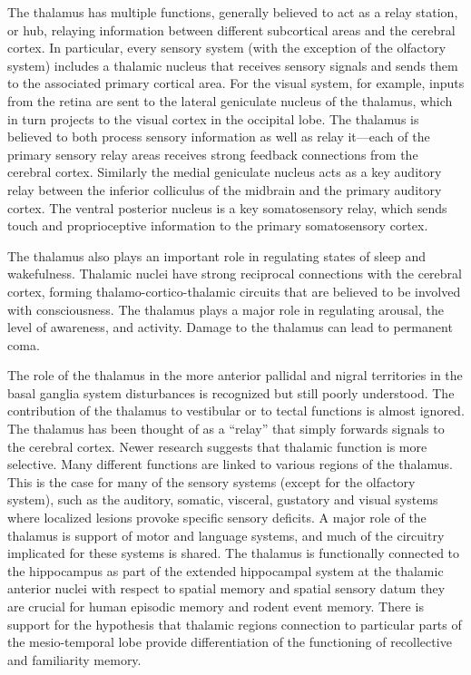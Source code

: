 The thalamus has multiple functions, generally believed to act as a relay station, or hub, relaying information between different subcortical areas and the cerebral cortex. In particular, every sensory system (with the exception of the olfactory system) includes a thalamic nucleus that receives sensory signals and sends them to the associated primary cortical area. For the visual system, for example, inputs from the retina are sent to the lateral geniculate nucleus of the thalamus, which in turn projects to the visual cortex in the occipital lobe. The thalamus is believed to both process sensory information as well as relay it---each of the primary sensory relay areas receives strong feedback connections from the cerebral cortex. Similarly the medial geniculate nucleus acts as a key auditory relay between the inferior colliculus of the midbrain and the primary auditory cortex. The ventral posterior nucleus is a key somatosensory relay, which sends touch and proprioceptive information to the primary somatosensory cortex.

The thalamus also plays an important role in regulating states of sleep and wakefulness. Thalamic nuclei have strong reciprocal connections with the cerebral cortex, forming thalamo-cortico-thalamic circuits that are believed to be involved with consciousness. The thalamus plays a major role in regulating arousal, the level of awareness, and activity. Damage to the thalamus can lead to permanent coma.

The role of the thalamus in the more anterior pallidal and nigral territories in the basal ganglia system disturbances is recognized but still poorly understood. The contribution of the thalamus to vestibular or to tectal functions is almost ignored. The thalamus has been thought of as a ``relay'' that simply forwards signals to the cerebral cortex. Newer research suggests that thalamic function is more selective. Many different functions are linked to various regions of the thalamus. This is the case for many of the sensory systems (except for the olfactory system), such as the auditory, somatic, visceral, gustatory and visual systems where localized lesions provoke specific sensory deficits. A major role of the thalamus is support of motor and language systems, and much of the circuitry implicated for these systems is shared. The thalamus is functionally connected to the hippocampus as part of the extended hippocampal system at the thalamic anterior nuclei with respect to spatial memory and spatial sensory datum they are crucial for human episodic memory and rodent event memory. There is support for the hypothesis that thalamic regions connection to particular parts of the mesio-temporal lobe provide differentiation of the functioning of recollective and familiarity memory.

